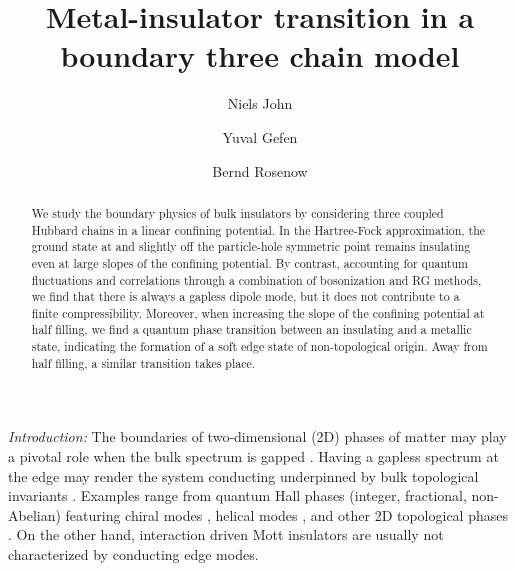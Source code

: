 \documentclass[twocolumn, prl, aps, floatfix, superscriptaddress, longbibliography]{revtex4-1}
\begin{document}
	
\title{Metal-insulator transition in a boundary three chain model}
	
\author{Niels John} 
	
\author{Yuval Gefen}

\author{Bernd Rosenow}
	
\begin{abstract}
	
	
We study the boundary physics of bulk insulators by considering three coupled Hubbard chains in a linear confining potential. In the Hartree-Fock approximation, the ground state at and slightly off the particle-hole symmetric point 
 remains insulating even at large slopes of the confining potential.  By contrast, accounting for quantum fluctuations and correlations through  a combination of bosonization and RG methods, we find that there is always a gapless dipole mode, but it does not contribute to a finite compressibility. Moreover, when increasing the slope of the confining potential at half filling, we find a quantum phase transition between an insulating and a metallic state, indicating the formation of a soft edge state of non-topological origin. Away from half filling, a similar transition takes place. 	
	
\end{abstract}
	
\maketitle
	
	

\noindent \textit{Introduction:} The boundaries of two-dimensional (2D) phases of matter may play a pivotal role when the bulk spectrum is gapped \cite{Halperin1982, Laughlin1981, Kane2015, Bernevig2006, Hasan2010, Qi2011, Koenig2007}. Having a gapless spectrum at the edge may render the system conducting underpinned by bulk topological invariants \cite{Altland1997, Wen2007}. Examples range from quantum Hall phases (integer, fractional, non-Abelian) featuring chiral modes \cite{Halperin1982, Laughlin1981}, helical modes \cite{Kane2005, Bernevig2006}, and other 2D topological phases \cite{Kosterlitz1972, Kosterlitz1973, Haldane1988}. On the other hand, interaction driven Mott insulators  \cite{Mott1949, Schulz} are usually not characterized by conducting edge modes.  
\end{document}
